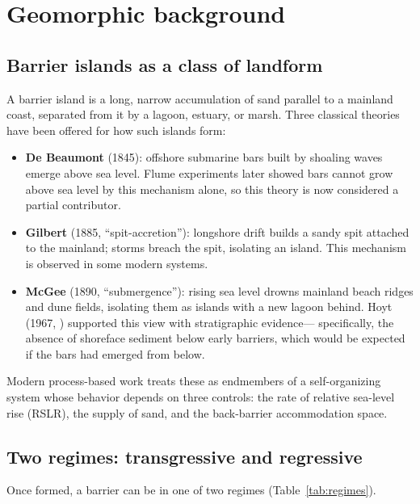 \documentclass[11pt]{article}
\begin{document}
\section{Geomorphic background}

\subsection{Barrier islands as a class of landform}

A barrier island is a long, narrow accumulation of sand parallel to a mainland coast,
separated from it by a lagoon, estuary, or marsh. Three classical theories have been
offered for how such islands form:

\begin{itemize}[leftmargin=2em]
\item \textbf{De Beaumont} (1845): offshore submarine bars built by shoaling waves
emerge above sea level. Flume experiments later showed bars cannot grow above
sea level by this mechanism alone, so this theory is now considered a partial
contributor.

\item \textbf{Gilbert} (1885, ``spit-accretion''): longshore drift builds a sandy spit
attached to the mainland; storms breach the spit, isolating an island. This
mechanism is observed in some modern systems.

\item \textbf{McGee} (1890, ``submergence''): rising sea level drowns mainland beach
ridges and dune fields, isolating them as islands with a new lagoon behind. Hoyt
(1967, \cite{hoyt1967}) supported this view with stratigraphic evidence---
specifically, the absence of shoreface sediment below early barriers, which would
be expected if the bars had emerged from below.
\end{itemize}

Modern process-based work \cite{mariotti2021} treats these as endmembers of a
self-organizing system whose behavior depends on three controls: the rate of
relative sea-level rise (RSLR), the supply of sand, and the back-barrier
accommodation space.

\subsection{Two regimes: transgressive and regressive}

Once formed, a barrier can be in one of two regimes (Table~\ref{tab:regimes}).
\end{document}
